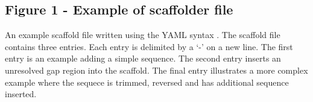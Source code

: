 \documentclass[10pt]{bmc_article}
\newenvironment{bmcformat}{\begin{raggedright}\baselineskip20pt\sloppy\setboolean{publ}{false}}{\end{raggedright}\baselineskip20pt\sloppy}
\begin{document}
\begin{bmcformat}
\subsection*{Figure 1 - Example of scaffolder file}

An example scaffold file written using the YAML syntax \cite{yaml}. The
scaffold file contains three entries. Each entry is delimited by a `-' on a new
line. The first entry is an example adding a simple sequence. The second entry
inserts an unresolved gap region into the scaffold. The final entry illustrates
a more complex example where the sequece is trimmed, reversed and has
additional sequence inserted. \pb

\end{bmcformat}
\end{document}
